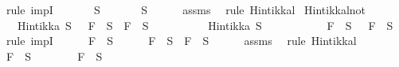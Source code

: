 \begin{isabellebody}
%
\isadelimproof
%
\endisadelimproof
%
\isatagproof
{}\isamarkupfalse%
\ {\isacharparenleft}rule\ impI{\isacharparenright}\isanewline
\ \ \isamarkupfalse%
\ {\isachardoublequoteopen}\isactrlbold {\isasymnot}\ {\isasymbottom}\ {\isasymin}\ S{\isachardoublequoteclose}\ \isanewline
\ \ \isamarkupfalse%
\ {\isachardoublequoteopen}{\isasymbottom}\ {\isasymnotin}\ S{\isachardoublequoteclose}\isanewline
\ \ \ \ \isamarkupfalse%
\ assms\ \isamarkupfalse%
\ {\isacharparenleft}rule\ Hintikka{\isacharunderscore}l{}{\isacharparenright}\isanewline
{}\isamarkupfalse%
%
\endisatagproof
{\isafoldproof}%
%
\isadelimproof
\isanewline
%
\endisadelimproof
\isanewline
{}\isamarkupfalse%
\ Hintikka{\isacharunderscore}l{}{}{\isacharunderscore}not{\isacharcolon}\ \isanewline
\ \ \ {\isachardoublequoteopen}Hintikka\ S\ {\isasymLongrightarrow}\ \isactrlbold {\isasymnot}\ F\ {\isasymin}\ S\ {\isasymlongrightarrow}\ F\ {\isasymnotin}\ S{\isachardoublequoteclose}\isanewline
\ \ \ \ \ \ \ \ \ \ {\isachardoublequoteopen}Hintikka\ S{\isachardoublequoteclose}\isanewline
\ \ \ \ \ \ \ \ \ {\isachardoublequoteopen}\isactrlbold {\isasymnot}\ {\isacharparenleft}\isactrlbold {\isasymnot}\ F{\isacharparenright}\ {\isasymin}\ S\ {\isasymlongrightarrow}\ \isactrlbold {\isasymnot}\ F\ {\isasymnotin}\ S{\isachardoublequoteclose}\isanewline
%
\isadelimproof
%
\endisadelimproof
%
\isatagproof
{}\isamarkupfalse%
\ {\isacharparenleft}rule\ impI{\isacharparenright}\isanewline
\ \ \isamarkupfalse%
\ {\isachardoublequoteopen}\isactrlbold {\isasymnot}\ {\isacharparenleft}\isactrlbold {\isasymnot}\ F{\isacharparenright}\ {\isasymin}\ S{\isachardoublequoteclose}\isanewline
\ \ \isamarkupfalse%
\ {\isachardoublequoteopen}\isactrlbold {\isasymnot}\ {\isacharparenleft}\isactrlbold {\isasymnot}\ F{\isacharparenright}\ {\isasymin}\ S\ {\isasymlongrightarrow}\ F\ {\isasymin}\ S{\isachardoublequoteclose}\isanewline
\ \ \ \ \isamarkupfalse%
\ assms{\isacharparenleft}{}{\isacharparenright}\ \isamarkupfalse%
\ {\isacharparenleft}rule\ Hintikka{\isacharunderscore}l{}{\isacharparenright}\isanewline
\ \ \isamarkupfalse%
\ \isamarkupfalse%
\ {\isachardoublequoteopen}F\ {\isasymin}\ S{\isachardoublequoteclose}\isanewline
\ \ \ \ \isamarkupfalse%
\ {\isacartoucheopen}\isactrlbold {\isasymnot}\ {\isacharparenleft}\isactrlbold {\isasymnot}\ F{\isacharparenright}\ {\isasymin}\ S{\isacartoucheclose}\ \isamarkupfalse%

\end{isabellebody}
